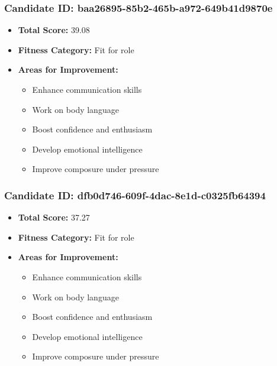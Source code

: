 \documentclass{article}
\begin{document}
\subsubsection{Candidate ID: baa26895-85b2-465b-a972-649b41d9870e}
\begin{itemize}
    \item \textbf{Total Score:} 39.08
    \item \textbf{Fitness Category:} Fit for role
    \item \textbf{Areas for Improvement:}
    \begin{itemize}
        \item Enhance communication skills
        \item Work on body language
        \item Boost confidence and enthusiasm
        \item Develop emotional intelligence
        \item Improve composure under pressure
    \end{itemize}
\end{itemize}

\subsubsection{Candidate ID: dfb0d746-609f-4dac-8e1d-c0325fb64394}
\begin{itemize}
    \item \textbf{Total Score:} 37.27
    \item \textbf{Fitness Category:} Fit for role
    \item \textbf{Areas for Improvement:}
    \begin{itemize}
        \item Enhance communication skills
        \item Work on body language
        \item Boost confidence and enthusiasm
        \item Develop emotional intelligence
        \item Improve composure under pressure
    \end{itemize}
\end{itemize}
\end{document}

